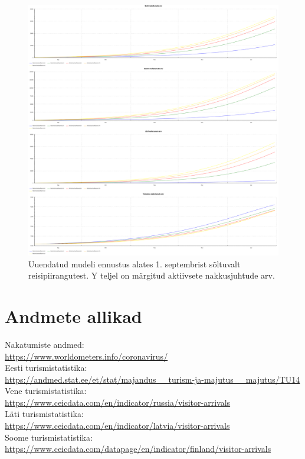\documentclass[a4paper]{article}
\begin{document}
  \begin{figure}
    \centering
    \includegraphics[width=\textwidth]{graphics/travel.png}
    \caption{Uuendatud mudeli ennustus alates 1. septembrist sõltuvalt reisipiirangutest. Y teljel on märgitud aktiivsete nakkusjuhtude arv.}
  \end{figure}

  \section{Andmete allikad}
  Nakatumiste andmed: \\
  \url{https://www.worldometers.info/coronavirus/} \\
  Eesti turismistatistika: \\
  \url{https://andmed.stat.ee/et/stat/majandus__turism-ja-majutus__majutus/TU14} \\
  Vene turismistatistika: \\
  \url{https://www.ceicdata.com/en/indicator/russia/visitor-arrivals} \\
  Läti turismistatistika: \\
  \url{https://www.ceicdata.com/en/indicator/latvia/visitor-arrivals} \\
  Soome turismistatistika: \\
  \url{https://www.ceicdata.com/datapage/en/indicator/finland/visitor-arrivals} \\
  
\end{document}
